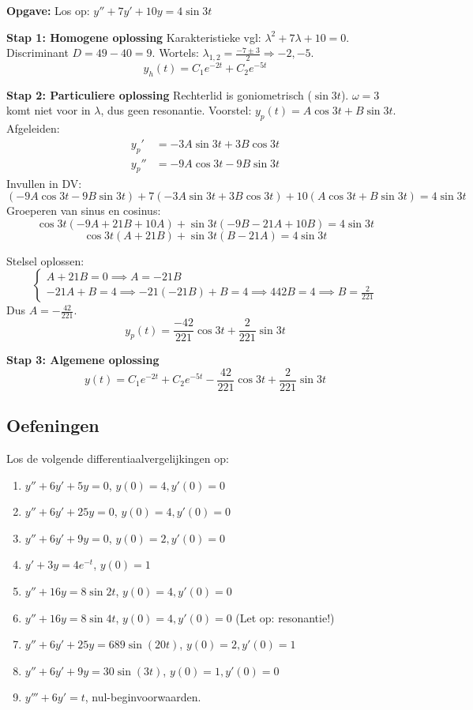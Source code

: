 \begin{oefenblok}
\textbf{Opgave:} Los op: $y'' + 7y' + 10y = 4\sin 3t$

\textbf{Stap 1: Homogene oplossing}
Karakteristieke vgl: $\lambda^2 + 7\lambda + 10 = 0$.
Discriminant $D = 49 - 40 = 9$. Wortels: $\lambda_{1,2} = \frac{-7 \pm 3}{2} \Rightarrow -2, -5$.
\[ y_h(t) = C_1 e^{-2t} + C_2 e^{-5t} \]

\textbf{Stap 2: Particuliere oplossing}
Rechterlid is goniometrisch ($\sin 3t$). $\omega=3$ komt niet voor in $\lambda$, dus geen resonantie.
Voorstel: $y_p(t) = A \cos 3t + B \sin 3t$.
Afgeleiden:
\begin{align*}
y_p' &= -3A \sin 3t + 3B \cos 3t \\
y_p'' &= -9A \cos 3t - 9B \sin 3t
\end{align*}
Invullen in DV:
\[ (-9A \cos 3t - 9B \sin 3t) + 7(-3A \sin 3t + 3B \cos 3t) + 10(A \cos 3t + B \sin 3t) = 4 \sin 3t \]
Groeperen van sinus en cosinus:
\[ \cos 3t (-9A + 21B + 10A) + \sin 3t (-9B - 21A + 10B) = 4 \sin 3t \]
\[ \cos 3t (A + 21B) + \sin 3t (B - 21A) = 4 \sin 3t \]

Stelsel oplossen:
\[
\begin{cases}
A + 21B = 0 \implies A = -21B \\
-21A + B = 4 \implies -21(-21B) + B = 4 \implies 442B = 4 \implies B = \frac{2}{221}
\end{cases}
\]
Dus $A = -\frac{42}{221}$.
\[ y_p(t) = \frac{-42}{221} \cos 3t + \frac{2}{221} \sin 3t \]

\textbf{Stap 3: Algemene oplossing}
\[ y(t) = C_1 e^{-2t} + C_2 e^{-5t} - \frac{42}{221} \cos 3t + \frac{2}{221} \sin 3t \]
\end{oefenblok}

\subsection{Oefeningen}
Los de volgende differentiaalvergelijkingen op:
\begin{enumerate}
    \item $y'' + 6y' + 5y = 0$, $y(0)=4, y'(0)=0$
    \item $y'' + 6y' + 25y = 0$, $y(0)=4, y'(0)=0$
    \item $y'' + 6y' + 9y = 0$, $y(0)=2, y'(0)=0$
    \item $y' + 3y = 4e^{-t}$, $y(0)=1$
    \item $y'' + 16y = 8\sin 2t$, $y(0)=4, y'(0)=0$
    \item $y'' + 16y = 8\sin 4t$, $y(0)=4, y'(0)=0$ (Let op: resonantie!)
    \item $y'' + 6y' + 25y = 689\sin(20t)$, $y(0)=2, y'(0)=1$
    \item $y'' + 6y' + 9y = 30\sin(3t)$, $y(0)=1, y'(0)=0$
    \item $y''' + 6y' = t$, nul-beginvoorwaarden.
\end{enumerate}